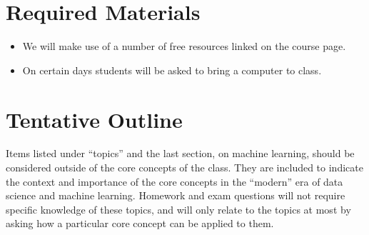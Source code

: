 \documentclass[11pt]{article}
\begin{document}
\bigskip


\section*{Required Materials}

\begin{itemize}
\item We will make use of a number of free resources linked on the course page.
\item On certain days students will be asked to bring a computer to class. 
\end{itemize}



\section*{Tentative Outline}

Items listed under ``topics'' and the last section, on machine learning, should be considered outside of the core concepts of the class. They are included to indicate the context and importance of the core concepts in the ``modern'' era of data science and machine learning. Homework and exam questions will not require specific knowledge of these topics, and will only relate to the topics at most by asking how a particular core concept can be applied to them.
\end{document}
